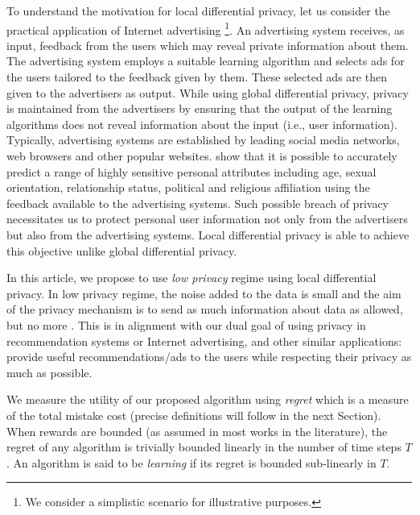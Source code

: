 \documentclass[letterpaper]{article} %
\begin{document}
To understand the motivation for local differential privacy, let us consider the practical application of Internet advertising \footnote{We consider a simplistic scenario for illustrative purposes.}. An advertising system receives, as input, feedback from the users which may reveal private information about them. The advertising system employs a suitable learning algorithm and selects ads for the users tailored to the feedback given by them. These selected ads are then given to the advertisers as output. 
While using global differential privacy, privacy is maintained from the advertisers by ensuring that the output of the learning algorithms does not reveal information about the input (i.e., user information). Typically, advertising systems are established by leading social media networks, web browsers and other popular websites. \citet{DBLP:conf/icdm/Korolova10,kosinski2013private} show that it is possible to accurately predict a range of highly sensitive personal attributes including age, sexual orientation, relationship status, political and religious affiliation
using the feedback available to the advertising systems. Such possible breach of privacy necessitates us to protect personal user information not only from the advertisers but also from the advertising systems. Local differential privacy is able to achieve this objective unlike global differential privacy.

In this article, we propose to use \textit{low privacy} regime using local differential privacy.  
In low privacy regime, the noise added to the data is small and the aim of the privacy mechanism is to send as much information about data as allowed, but no more \citep{NIPS2014_5392}. This is in alignment with our dual goal of using privacy in recommendation systems or Internet advertising, and other similar applications: provide useful recommendations/ads to the users while respecting their privacy as much as possible.

We measure the utility of our proposed algorithm using \textit{regret} which is a measure of the total mistake cost (precise definitions will follow in the next Section). When rewards are bounded (as assumed in most works in the literature), the regret of any algorithm is trivially bounded linearly in the number of time steps $T$. An algorithm is said to be \textit{learning} if its regret is bounded sub-linearly in $T$.
\end{document}
